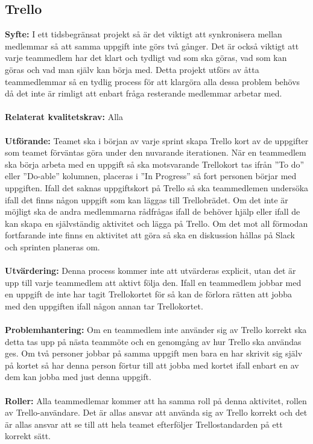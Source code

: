 \documentclass[10pt]{article}
\begin{document}
	\subsection{Trello}
	\textbf{Syfte:}	I ett tidsbegränsat projekt så är det viktigt att synkronisera mellan medlemmar så att samma uppgift inte görs två gånger. Det är också viktigt att varje teammedlem har det klart och tydligt vad som ska göras, vad som kan göras och vad man själv kan börja med. Detta projekt utförs av åtta teammedlemmar så en tydlig process för att klargöra alla dessa problem behövs då det inte är rimligt att enbart fråga resterande medlemmar arbetar med.
	\\\\
	\textbf{Relaterat kvalitetskrav:} Alla
	\\\\
	\textbf{Utförande:} Teamet ska i början av varje sprint skapa Trello kort av de uppgifter som teamet förväntas göra under den nuvarande iterationen. När en teammedlem ska börja arbeta med en uppgift så ska motsvarande Trellokort tas ifrån ''To do'' eller ''Do-able'' kolumnen, placeras i ''In Progress'' så fort personen börjar med uppgiften. Ifall det saknas uppgiftskort på Trello så ska teammedlemen undersöka ifall det finns någon uppgift som kan läggas till Trellobrädet. Om det inte är möjligt ska de andra medlemmarna rådfrågas ifall de behöver hjälp eller ifall de kan skapa en självständig aktivitet och lägga på Trello. Om det mot all förmodan fortfarande inte finns en aktivitet att göra så ska en diskussion hållas på Slack och sprinten planeras om.
	\\\\
	\textbf{Utvärdering:} Denna process kommer inte att utvärderas explicit, utan det är upp till varje teammedlem att aktivt följa den. Ifall en teammedlem jobbar med en uppgift de inte har tagit Trellokortet för så kan de förlora rätten att jobba med den uppgiften ifall någon annan tar Trellokortet.
	\\\\
	\textbf{Problemhantering:} Om en teammedlem inte använder sig av Trello korrekt ska detta tas upp på nästa teammöte och en genomgång av hur Trello ska användas ges. Om två personer jobbar på samma uppgift men bara en har skrivit sig själv på kortet så har denna person förtur till att jobba med kortet ifall enbart en av dem kan jobba med just denna uppgift.
	\\\\
	\textbf{Roller:} Alla teammedlemar kommer att ha samma roll på denna aktivitet, rollen av Trello-användare. Det är allas ansvar att använda sig av Trello korrekt och det är allas ansvar att se till att hela teamet efterföljer Trellostandarden på ett korrekt sätt.
	
\end{document}
